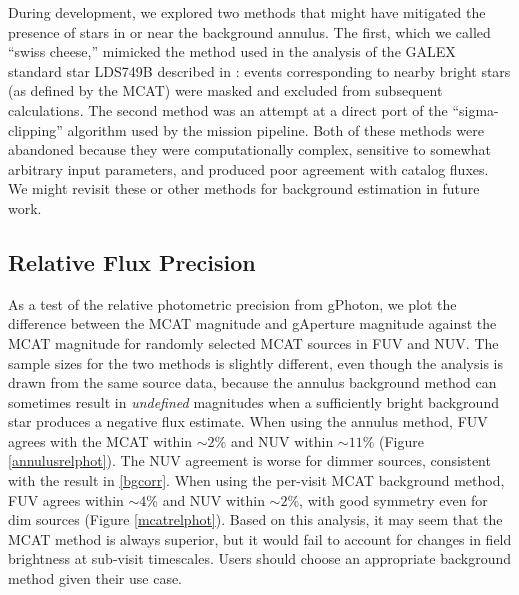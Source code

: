 \documentclass[preprint]{aastex}
\begin{document}
During development, we explored two methods that might have mitigated the presence of stars in or near the background annulus. The first, which we called ``swiss cheese,'' mimicked the method used in the analysis of the GALEX standard star LDS749B described in \citep{mor2007}: events corresponding to nearby bright stars (as defined by the MCAT) were masked and excluded from subsequent calculations. The second method was an attempt at a direct port of the ``sigma-clipping'' algorithm used by the mission pipeline. Both of these methods were abandoned because they were computationally complex, sensitive to somewhat arbitrary input parameters, and produced poor agreement with catalog fluxes. We might revisit these or other methods for background estimation in future work.

\subsection{Relative Flux Precision}
\label{relflux}
As a test of the relative photometric precision from gPhoton, we plot the difference between the MCAT magnitude and gAperture magnitude against the MCAT magnitude for randomly selected MCAT sources in FUV and NUV. The sample sizes for the two methods is slightly different, even though the analysis is drawn from the same source data, because the annulus background method can sometimes result in \emph{undefined} magnitudes when a sufficiently bright background star produces a negative flux estimate. When using the annulus method, FUV agrees with the MCAT within $\sim 2$\% and NUV within $\sim 11$\% (Figure \ref{annulusrelphot}). The NUV agreement is worse for dimmer sources, consistent with the result in \ref{bgcorr}. When using the per-visit MCAT background method, FUV agrees within $\sim 4$\% and NUV within $\sim 2$\%, with good symmetry even for dim sources (Figure \ref{mcatrelphot}). Based on this analysis, it may seem that the MCAT method is always superior, but it would fail to account for changes in field brightness at sub-visit timescales. Users should choose an appropriate background method given their use case.
\end{document}
